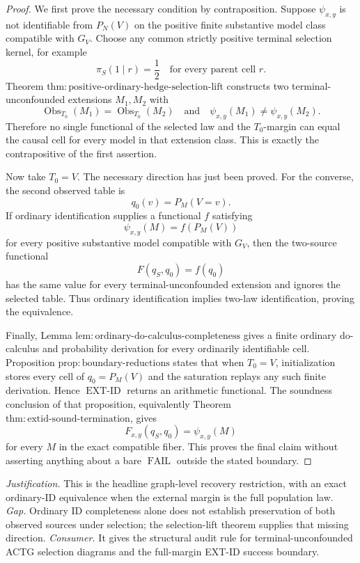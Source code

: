 \documentclass{article}
\begin{document}
\begin{proof}
We first prove the necessary condition by contraposition. Suppose \(\psi_{x,y}\) is not identifiable from \(P_N(V)\) on the positive finite substantive model class compatible with \(G_V\). Choose any common strictly positive terminal selection kernel, for example
\[
 \pi_S(1\mid r)=\frac12
 \quad\text{for every parent cell }r.
\]
Theorem \(\mathrm{thm{:}positive\text{-}ordinary\text{-}hedge\text{-}selection\text{-}lift}\) constructs two terminal-unconfounded extensions \(M_1,M_2\) with
\[
 \operatorname{Obs}_{T_0}(M_1)=\operatorname{Obs}_{T_0}(M_2)
 \quad\text{and}\quad
 \psi_{x,y}(M_1)\ne\psi_{x,y}(M_2).
\]
Therefore no single functional of the selected law and the \(T_0\)-margin can equal the causal cell for every model in that extension class. This is exactly the contrapositive of the first assertion.

Now take \(T_0=V\). The necessary direction has just been proved. For the converse, the second observed table is
\[
 q_0(v)=P_M(V=v).
\]
If ordinary identification supplies a functional \(f\) satisfying
\[
 \psi_{x,y}(M)=f(P_M(V))
\]
for every positive substantive model compatible with \(G_V\), then the two-source functional
\[
 F(q_S,q_0)=f(q_0)
\]
has the same value for every terminal-unconfounded extension and ignores the selected table. Thus ordinary identification implies two-law identification, proving the equivalence.

Finally, Lemma \(\mathrm{lem{:}ordinary\text{-}do\text{-}calculus\text{-}completeness}\) gives a finite ordinary do-calculus and probability derivation for every ordinarily identifiable cell. Proposition \(\mathrm{prop{:}boundary\text{-}reductions}\) states that when \(T_0=V\), initialization stores every cell of \(q_0=P_M(V)\) and the saturation replays any such finite derivation. Hence \(\operatorname{EXT\text{-}ID}\) returns an arithmetic functional. The soundness conclusion of that proposition, equivalently Theorem \(\mathrm{thm{:}extid\text{-}sound\text{-}termination}\), gives
\[
 F_{x,y}(q_S,q_0)=\psi_{x,y}(M)
\]
for every \(M\) in the exact compatible fiber. This proves the final claim without asserting anything about a bare \(\operatorname{FAIL}\) outside the stated boundary.
\end{proof}
\par\smallskip\noindent \textit{Justification.} This is the headline graph-level recovery restriction, with an exact ordinary-ID equivalence when the external margin is the full population law. \textit{Gap.} Ordinary ID completeness alone does not establish preservation of both observed sources under selection; the selection-lift theorem supplies that missing direction. \textit{Consumer.} It gives the structural audit rule for terminal-unconfounded ACTG selection diagrams and the full-margin EXT-ID success boundary.
\end{document}
